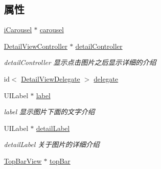 \subsection*{属性}
\begin{DoxyCompactItemize}
\item 
\hyperlink{interfacei_carousel}{i\-Carousel} $\ast$ \hyperlink{interface_main_view_controller_aff97c901f4d7d451fa2cdca04a7bac95}{carousel}
\item 
\hypertarget{interface_main_view_controller_adcdd91fa1f396efe10cfaf47910af2a1}{\hyperlink{interface_detail_view_controller}{Detail\-View\-Controller} $\ast$ \hyperlink{interface_main_view_controller_adcdd91fa1f396efe10cfaf47910af2a1}{detail\-Controller}}\label{interface_main_view_controller_adcdd91fa1f396efe10cfaf47910af2a1}

\begin{DoxyCompactList}\small\item\em detail\-Controller 显示点击图片之后显示详细的介绍 \end{DoxyCompactList}\item 
id$<$ \hyperlink{protocol_detail_view_delegate-p}{Detail\-View\-Delegate} $>$ \hyperlink{interface_main_view_controller_a75888987a8cb0262169d2a4ef4e80d2a}{delegate}
\item 
\hypertarget{interface_main_view_controller_a2f291676842fc98f04dfa26344a09593}{U\-I\-Label $\ast$ \hyperlink{interface_main_view_controller_a2f291676842fc98f04dfa26344a09593}{label}}\label{interface_main_view_controller_a2f291676842fc98f04dfa26344a09593}

\begin{DoxyCompactList}\small\item\em label 显示图片下面的文字介绍 \end{DoxyCompactList}\item 
\hypertarget{interface_main_view_controller_a243da297ab8ff34a78b80d4677315e4e}{U\-I\-Label $\ast$ \hyperlink{interface_main_view_controller_a243da297ab8ff34a78b80d4677315e4e}{detail\-Label}}\label{interface_main_view_controller_a243da297ab8ff34a78b80d4677315e4e}

\begin{DoxyCompactList}\small\item\em detail\-Label 关于图片的详细介绍 \end{DoxyCompactList}\item 
\hypertarget{interface_main_view_controller_a7d6a8d4a24ac609e7545bf6c07d7786c}{\hyperlink{interface_top_bar_view}{Top\-Bar\-View} $\ast$ \hyperlink{interface_main_view_controller_a7d6a8d4a24ac609e7545bf6c07d7786c}{top\-Bar}}\label{interface_main_view_controller_a7d6a8d4a24ac609e7545bf6c07d7786c}


\end{DoxyCompactItemize}
